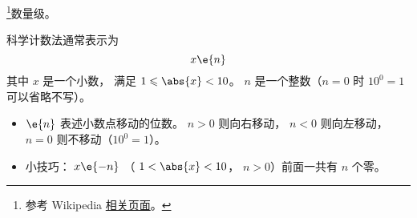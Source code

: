 
\begin{issues}
\issueDraft
\end{issues}

\footnote{参考 Wikipedia \href{https://en.wikipedia.org/wiki/Order_of_magnitude}{相关页面}。}数量级。

科学计数法通常表示为
\begin{equation}
x \e{n}
\end{equation}
其中 $x$ 是一个小数， 满足 $1 \leqslant \abs{x} < 10$。 $n$ 是一个整数（$n=0$ 时 $10^{0} = 1$ 可以省略不写）。

\begin{itemize}
\item $\e{n}$ 表述小数点移动的位数。 $n > 0$ 则向右移动， $n < 0$ 则向左移动， $n=0$ 则不移动（$10^{0} = 1$）。
\item 小技巧： $x\e{-n}$ （ $1 < \abs{x} < 10$， $n > 0$）前面一共有 $n$ 个零。
\end{itemize}

